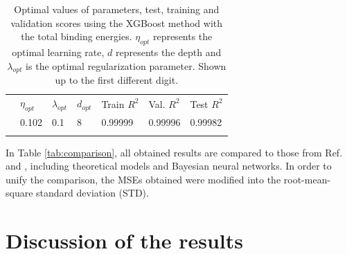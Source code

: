 \documentclass[numberedappendix, twocolappendix]{emulateapj}
\begin{document}
\begin{table}[!htb]
\begin{center}
\caption{Optimal values of parameters, test, training and validation scores using the XGBoost method with the total binding energies. $\eta_{opt}$ represents the optimal learning rate, $d$ represents the depth and $\lambda_{opt}$ is the optimal regularization parameter. Shown up to the first different digit.}
\label{tab: XGB article}  
\begin{tabular}{lllllll}
\cline{2-7}\noalign{\smallskip}\cline{2-7}\noalign{\smallskip} 
& $\eta_{opt}$ & $\lambda_{opt}$ & $d_{opt}$ & Train $R^2$ & Val. $R^2$ & Test $R^2$\\ \noalign{\smallskip}\hline\noalign{\smallskip} \hline\noalign{\smallskip}
\multicolumn{1}{l|}{XGB} & 0.102 & 0.1 & 8 & 0.99999 & 0.99996 & 0.99982\\
\noalign{\smallskip}\hline
\end{tabular}
\end{center}
\end{table}




In Table \ref{tab:comparison}, all obtained results are compared to those from Ref. \cite{utama2017} and \cite{trees in nuclear}, including theoretical models and Bayesian neural networks. In order to unify the comparison, the MSEs obtained were modified into the root-mean-square standard deviation (STD).


\section{Discussion of the results}
\label{sec: Discussion}
\end{document}

